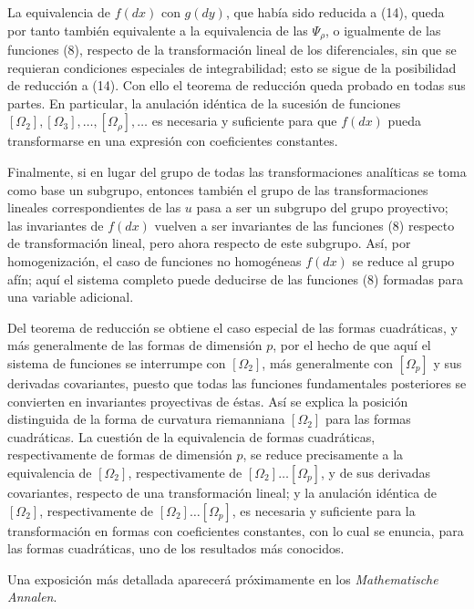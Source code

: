 \documentclass[11pt]{article}
\begin{document}
La equivalencia de \(f(dx)\) con \(g(dy)\), que había sido reducida a (14),
queda por tanto también equivalente a la equivalencia de las \(\Psi_\rho\), o
igualmente de las funciones (8), respecto de la transformación lineal de los
diferenciales, sin que se requieran condiciones especiales de integrabilidad;
esto se sigue de la posibilidad de reducción a (14). Con ello el teorema de
reducción queda probado en todas sus partes. En particular, la anulación
idéntica de la sucesión de funciones \([\Omega_2],[\Omega_3],\ldots,
[\Omega_\rho],\ldots\) es necesaria y suficiente para que \(f(dx)\) pueda
transformarse en una expresión con coeficientes constantes.

Finalmente, si en lugar del grupo de todas las transformaciones analíticas se
toma como base un subgrupo, entonces también el grupo de las transformaciones
lineales correspondientes de las \(u\) pasa a ser un subgrupo del grupo
proyectivo; las invariantes de \(f(dx)\) vuelven a ser invariantes de las
funciones (8) respecto de transformación lineal, pero ahora respecto de este
subgrupo. Así, por homogenización, el caso de funciones no homogéneas \(f(dx)\)
se reduce al grupo afín; aquí el sistema completo puede deducirse de las
funciones (8) formadas para una variable adicional.

Del teorema de reducción se obtiene el caso especial de las formas cuadráticas,
y más generalmente de las formas de dimensión \(p\), por el hecho de que aquí el
sistema de funciones se interrumpe con \([\Omega_2]\), más generalmente con
\([\Omega_p]\) y sus derivadas covariantes, puesto que todas las funciones
fundamentales posteriores se convierten en invariantes proyectivas de éstas.
Así se explica la posición distinguida de la forma de curvatura riemanniana
\([\Omega_2]\) para las formas cuadráticas. La cuestión de la equivalencia de
formas cuadráticas, respectivamente de formas de dimensión \(p\), se reduce
precisamente a la equivalencia de \([\Omega_2]\), respectivamente de
\([\Omega_2]\ldots[\Omega_p]\), y de sus derivadas covariantes, respecto de una
transformación lineal; y la anulación idéntica de \([\Omega_2]\), respectivamente
de \([\Omega_2]\ldots[\Omega_p]\), es necesaria y suficiente para la
transformación en formas con coeficientes constantes, con lo cual se enuncia,
para las formas cuadráticas, uno de los resultados más conocidos.

Una exposición más detallada aparecerá próximamente en los \emph{Mathematische Annalen}.

\clearpage
\end{document}
